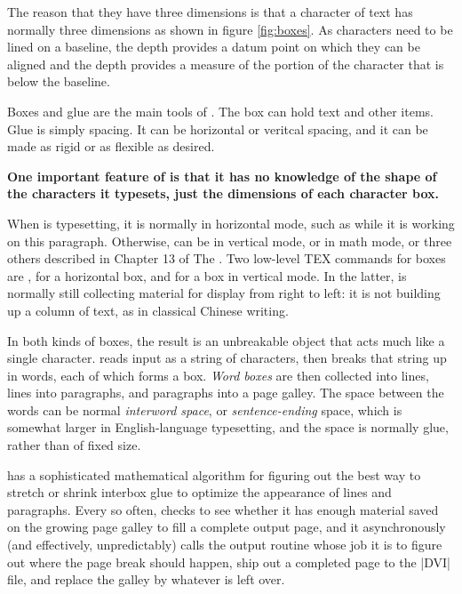 The reason that they have three dimensions is that a character of text has normally three dimensions as shown in figure \ref{fig:boxes}. As characters need to be lined on a baseline, the depth provides a datum point on which they can be aligned and the depth provides a measure of the portion of the character that is below the baseline.


Boxes and glue are the main tools of \tex. The box can hold text and other items. Glue is simply spacing. It can be horizontal or veritcal spacing, and it can be made as rigid or as flexible as desired.



\begin{minipage}{\linewidth}
\textbf{One important feature of \tex is that it has no knowledge of the shape of the characters it typesets, just the dimensions of each character box.}
\end{minipage}
\medskip

When \tex is typesetting, it is normally in horizontal mode, such as while
it is working on this paragraph. Otherwise, \tex can be in vertical mode, or
in math mode, or three others described in Chapter 13 of The \texbook.
Two low-level TEX commands for boxes are , for a horizontal box,
and  for a box in vertical mode. In the latter, \tex is normally still
collecting material for display from right to left: it is not building up a
column of text, as in classical Chinese writing.

In both kinds of boxes, the result is an unbreakable object that acts
much like a single character. \tex reads input as a string of characters,
then breaks that string up in words, each of which forms a box. 
\emph{Word boxes}
are then collected into lines, lines into paragraphs, and paragraphs into a
page galley. The space between the words can be normal \emph{interword space},
or \emph{sentence-ending} space, which is somewhat larger in English-language
typesetting, and the space is normally glue, rather than of fixed size.

\tex has a sophisticated mathematical algorithm for figuring out the
best way to stretch or shrink interbox glue to optimize the appearance of
lines and paragraphs. Every so often, \tex checks to see whether it has
enough material saved on the growing page galley to fill a complete output
page, and it asynchronously (and effectively, unpredictably) calls the
output routine whose job it is to figure out where the page break should
happen, ship out a completed page to the |DVI|  file, and replace the galley by
whatever is left over.

